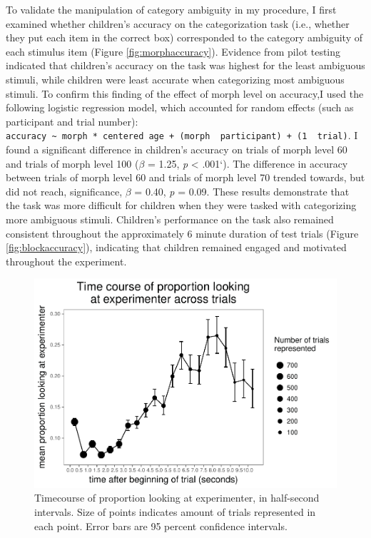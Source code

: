\documentclass[floatsintext,man]{apa6}
\theoremstyle{definition}
\theoremstyle{definition}
\theoremstyle{definition}
\theoremstyle{remark}
\begin{document}
To validate the manipulation of category ambiguity in my procedure, I
first examined whether children's accuracy on the categorization task
(i.e., whether they put each item in the correct box) corresponded to
the category ambiguity of each stimulus item (Figure
\ref{fig:morphaccuracy}). Evidence from pilot testing indicated that
children's accuracy on the task was highest for the least ambiguous
stimuli, while children were least accurate when categorizing most
ambiguous stimuli. To confirm this finding of the effect of morph level
on accuracy,I used the following logistic regression model, which
accounted for random effects (such as participant and trial number):
\texttt{accuracy\ \textasciitilde{}\ morph\ *\ centered\ age\ +\ (morph\ \textbar{}\ participant)\ +\ (1\ \textbar{}\ trial)}.
I found a significant difference in children's accuracy on trials of
morph level 60 and trials of morph level 100 (\(\beta\) = 1.25, \emph{p}
\textless{} .001`). The difference in accuracy between trials of morph
level 60 and trials of morph level 70 trended towards, but did not
reach, significance, \(\beta\) = 0.40, \emph{p} = 0.09. These results
demonstrate that the task was more difficult for children when they were
tasked with categorizing more ambiguous stimuli. Children's performance
on the task also remained consistent throughout the approximately 6
minute duration of test trials (Figure \ref{fig:blockaccuracy}),
indicating that children remained engaged and motivated throughout the
experiment.

\begin{figure}
\centering
\includegraphics{soc_ref_category_paper_files/figure-latex/forwardtimecourse-1.pdf}
\caption{\label{fig:forwardtimecourse}Timecourse of proportion looking at
experimenter, in half-second intervals. Size of points indicates amount
of trials represented in each point. Error bars are 95 percent
confidence intervals.}
\end{figure}
\end{document}
